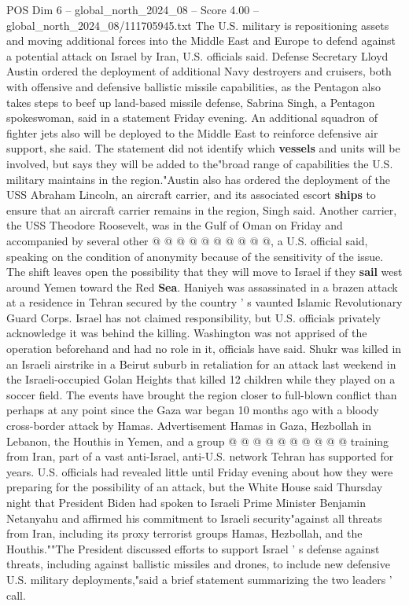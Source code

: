 \begin{textsample}{POS Dim 6 – global\_north\_2024\_08 – Score 4.00 – global\_north\_2024\_08/111705945.txt}  \label{ex:f6_pos_298}
The U.S. military is repositioning assets and moving additional forces into the Middle East and Europe to defend against a potential attack on Israel by Iran, U.S. officials said.
Defense Secretary Lloyd Austin ordered the deployment of additional Navy destroyers and cruisers, both with offensive and defensive ballistic missile capabilities, as the Pentagon also takes steps to beef up land-based missile defense, Sabrina Singh, a Pentagon spokeswoman, said in a statement Friday evening.
An additional squadron of fighter jets also will be deployed to the Middle East to reinforce defensive air support, she said.
The statement did not identify which \textbf{vessels} and units will be involved, but says they will be added to the"broad range of capabilities the U.S. military maintains in the region."Austin also has ordered the deployment of the USS Abraham Lincoln, an aircraft carrier, and its associated escort \textbf{ships} to ensure that an aircraft carrier remains in the region, Singh said.
Another carrier, the USS Theodore Roosevelt, was in the Gulf of Oman on Friday and accompanied by several other @ @ @ @ @ @ @ @ @ @, a U.S. official said, speaking on the condition of anonymity because of the sensitivity of the issue.
The shift leaves open the possibility that they will move to Israel if they \textbf{sail} west around Yemen toward the Red \textbf{Sea}.
Haniyeh was assassinated in a brazen attack at a residence in Tehran secured by the country ' s vaunted Islamic Revolutionary Guard Corps.
Israel has not claimed responsibility, but U.S. officials privately acknowledge it was behind the killing.
Washington was not apprised of the operation beforehand and had no role in it, officials have said.
Shukr was killed in an Israeli airstrike in a Beirut suburb in retaliation for an attack last weekend in the Israeli-occupied Golan Heights that killed 12 children while they played on a soccer field.
The events have brought the region closer to full-blown conflict than perhaps at any point since the Gaza war began 10 months ago with a bloody cross-border attack by Hamas.
Advertisement Hamas in Gaza, Hezbollah in Lebanon, the Houthis in Yemen, and a group @ @ @ @ @ @ @ @ @ @ training from Iran, part of a vast anti-Israel, anti-U.S. network Tehran has supported for years.
U.S. officials had revealed little until Friday evening about how they were preparing for the possibility of an attack, but the White House said Thursday night that President Biden had spoken to Israeli Prime Minister Benjamin Netanyahu and affirmed his commitment to Israeli security"against all threats from Iran, including its proxy terrorist groups Hamas, Hezbollah, and the Houthis.""The President discussed efforts to support Israel ' s defense against threats, including against ballistic missiles and drones, to include new defensive U.S. military deployments,"said a brief statement summarizing the two leaders ' call.

\end{textsample}
